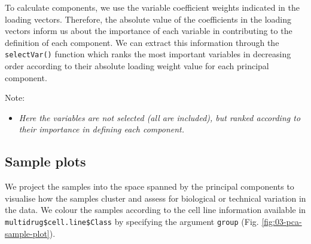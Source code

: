 \documentclass[
]{book}
\newenvironment{Shaded}{\begin{snugshade}}{\end{snugshade}}
\newcommand{\AttributeTok}[1]{\textcolor[rgb]{0.77,0.63,0.00}{#1}}
\newcommand{\CommentTok}[1]{\textcolor[rgb]{0.56,0.35,0.01}{\textit{#1}}}
\newcommand{\ConstantTok}[1]{\textcolor[rgb]{0.00,0.00,0.00}{#1}}
\newcommand{\DecValTok}[1]{\textcolor[rgb]{0.00,0.00,0.81}{#1}}
\newcommand{\FunctionTok}[1]{\textcolor[rgb]{0.00,0.00,0.00}{#1}}
\newcommand{\NormalTok}[1]{#1}
\newcommand{\SpecialCharTok}[1]{\textcolor[rgb]{0.00,0.00,0.00}{#1}}
\newcommand{\StringTok}[1]{\textcolor[rgb]{0.31,0.60,0.02}{#1}}
\providecommand{\tightlist}{%
  \setlength{\itemsep}{0pt}\setlength{\parskip}{0pt}}
\begin{document}
To calculate components, we use the variable coefficient weights indicated in the loading vectors. Therefore, the absolute value of the coefficients in the loading vectors inform us about the importance of each variable in contributing to the definition of each component. We can extract this information through the \texttt{selectVar()} function which ranks the most important variables in decreasing order according to their absolute loading weight value for each principal component.

\begin{Shaded}
\end{Shaded}

Note:

\begin{itemize}
\tightlist
\item
  \emph{Here the variables are not selected (all are included), but ranked according to their importance in defining each component.}
\end{itemize}

\hypertarget{03:pca-sample-plot}{%
\subsection{Sample plots}\label{03:pca-sample-plot}}

We project the samples into the space spanned by the principal components to visualise how the samples cluster and assess for biological or technical variation in the data. We colour the samples according to the cell line information available in \texttt{multidrug\$cell.line\$Class} by specifying the argument \texttt{group} (Fig. \ref{fig:03-pca-sample-plot}).

\begin{Shaded}
\end{Shaded}
\end{document}
